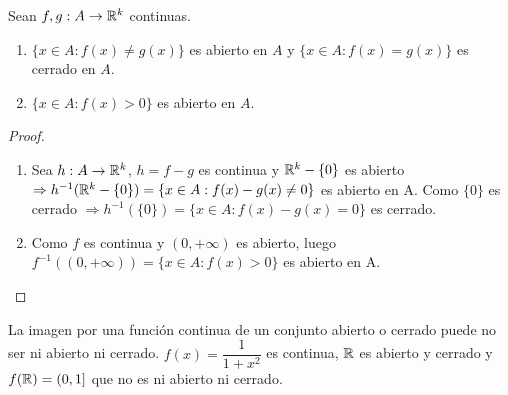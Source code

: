 \clearpage

\begin{corollary}
  Sean \(f, g: A \to \mathbb{R}^k\) continuas.
  \begin{enumerate}
    \item \(\{ x \in A : f(x) \neq g(x) \}\) es abierto en \(A\) y \(\{x \in A: f(x) = g(x)\}\) es cerrado en \(A\).
    \item \(\{x \in A : f(x) > 0\}\) es abierto en \(A\).
  \end{enumerate}
  \begin{proof}
    \begin{enumerate}
      \item Sea \(h: A \to \mathbb{R}^k\), \(h = f - g\) es continua y \(\mathbb{R}^k - \{0\}\) es abierto \(\Rightarrow h^{-1}(\mathbb{R}^k - \{0\}) = \{ x \in A : f(x) - g(x) \neq 0 \}\) es abierto en A. Como \(\{0\}\) es cerrado \(\Rightarrow h^{-1}(\{0\}) = \{ x \in A : f(x) - g(x) = 0\}\) es cerrado.
      \item Como \(f\) es continua y \((0, +\infty)\) es abierto, luego \(f^{-1}((0, +\infty)) = \{x \in A : f(x) > 0\}\) es abierto en A.
    \end{enumerate}
  \end{proof}
\end{corollary}

\begin{note}
  La imagen por una función continua de un conjunto abierto o cerrado puede no ser ni abierto ni cerrado. \(f(x) = \dfrac{1}{1+x^2}\) es continua, \(\mathbb{R}\) es abierto y cerrado y \(f(\mathbb{R}) = (0, 1]\) que no es ni abierto ni cerrado.
\end{note}
